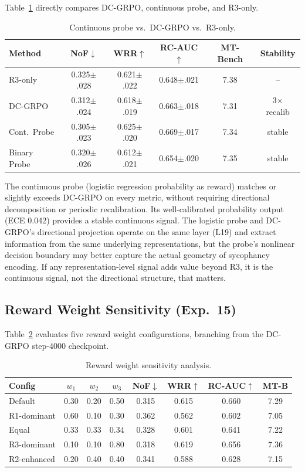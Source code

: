 \documentclass[11pt,a4paper]{article}
\begin{document}
Table~\ref{tab:cont_probe} directly compares DC-GRPO, continuous probe, and R3-only.

\begin{table}[h]
\centering
\small
\caption{Continuous probe vs.\ DC-GRPO vs.\ R3-only.}
\label{tab:cont_probe}
\begin{tabular}{lccccc}
\toprule
Method & NoF$\downarrow$ & WRR$\uparrow$ & RC-AUC$\uparrow$ & MT-Bench & Stability \\
\midrule
R3-only      & 0.325$\pm$.028 & 0.621$\pm$.022 & 0.648$\pm$.021 & 7.38 & --          \\
DC-GRPO      & 0.312$\pm$.024 & 0.618$\pm$.019 & 0.663$\pm$.018 & 7.31 & 3$\times$ recalib \\
Cont.\ Probe & 0.305$\pm$.023 & 0.625$\pm$.020 & 0.669$\pm$.017 & 7.34 & stable      \\
Binary Probe & 0.320$\pm$.026 & 0.612$\pm$.021 & 0.654$\pm$.020 & 7.35 & stable      \\
\bottomrule
\end{tabular}
\end{table}

The continuous probe (logistic regression probability as reward) matches or slightly exceeds DC-GRPO on every metric, without requiring directional decomposition or periodic recalibration. Its well-calibrated probability output (ECE 0.042) provides a stable continuous signal. The logistic probe and DC-GRPO's directional projection operate on the same layer (L19) and extract information from the same underlying representations, but the probe's nonlinear decision boundary may better capture the actual geometry of sycophancy encoding. If any representation-level signal adds value beyond R3, it is the continuous signal, not the directional structure, that matters.

\subsection{Reward Weight Sensitivity (Exp.\ 15)}

Table~\ref{tab:weight_sens} evaluates five reward weight configurations, branching from the DC-GRPO step-4000 checkpoint.

\begin{table}[h]
\centering
\small
\caption{Reward weight sensitivity analysis.}
\label{tab:weight_sens}
\begin{tabular}{lccccccc}
\toprule
Config & $w_1$ & $w_2$ & $w_3$ & NoF$\downarrow$ & WRR$\uparrow$ & RC-AUC$\uparrow$ & MT-B \\
\midrule
Default       & 0.30 & 0.20 & 0.50 & 0.315 & 0.615 & 0.660 & 7.29 \\
R1-dominant   & 0.60 & 0.10 & 0.30 & 0.362 & 0.562 & 0.602 & 7.05 \\
Equal         & 0.33 & 0.33 & 0.34 & 0.328 & 0.601 & 0.641 & 7.22 \\
R3-dominant   & 0.10 & 0.10 & 0.80 & 0.318 & 0.619 & 0.656 & 7.36 \\
R2-enhanced   & 0.20 & 0.40 & 0.40 & 0.341 & 0.588 & 0.628 & 7.15 \\
\bottomrule
\end{tabular}
\end{table}
\end{document}
